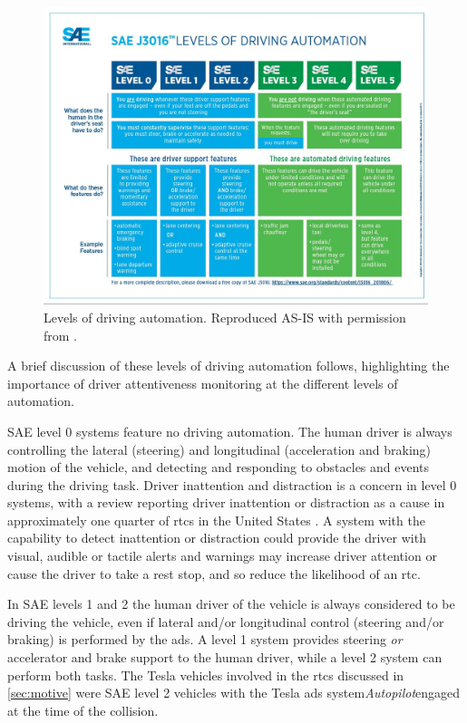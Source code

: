 \documentclass[11pt, parskip=half*,twoside=false]{scrbook}
\begin{document}
\begin{figure}[h]
	\centering
	\includegraphics[width=\textwidth]{sae_av_levels} 
	\caption{Levels of driving automation. Reproduced AS-IS with permission from \citet{J3016_201806}.}
	\label{fig:av_levels}
\end{figure}

A brief discussion of these levels of driving automation follows, highlighting the importance of driver attentiveness monitoring at the different levels of automation. 

SAE level 0 systems feature no driving automation. The human driver is always controlling the lateral (steering) and longitudinal (acceleration and braking) motion of the vehicle, and detecting and responding to obstacles and events during the driving task. Driver inattention and distraction is a concern in level 0 systems, with a review reporting driver inattention or distraction as a cause in approximately one quarter of \glspl{rtc} in the United States \citep{youngDriverDistraction2007}. A system with the capability to detect inattention or distraction could provide the driver with visual, audible or tactile alerts and warnings may increase driver attention or cause the driver to take a rest stop, and so reduce the likelihood of an \gls{rtc}.

In SAE levels 1 and 2 the human driver of the vehicle is always considered to be driving the vehicle, even if lateral and/or longitudinal control (steering and/or braking) is performed by the \gls{ads}. A level 1 system provides steering \emph{or} accelerator and brake support to the human driver, while a level 2 system can perform both tasks. The Tesla vehicles involved in the \glspl{rtc} discussed in \cref{sec:motive} were SAE level 2 vehicles with the Tesla \gls{ads} system\textemdash \emph{Autopilot}\textemdash engaged at the time of the collision. 
\end{document}
